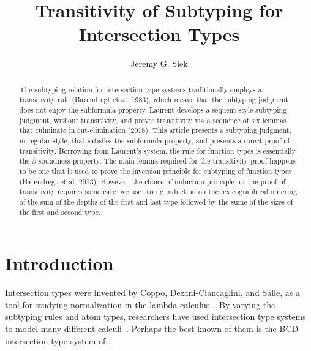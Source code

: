 \documentclass{article}
\title{Transitivity of Subtyping for Intersection Types}
\author{Jeremy G. Siek}
\begin{document}
\maketitle

\newcommand{\TOP}{\ensuremath{\mathtt{U}}}
\newcommand{\dom}[1]{\mathrm{dom}(#1)}
\newcommand{\cod}[1]{\mathrm{cod}(#1)}


\begin{abstract}
  The subtyping relation for intersection type systems traditionally
  employs a transitivity rule (Barendregt et al. 1983), which means
  that the subtyping judgment does not enjoy the subformula property.
  Laurent develops a sequent-style subtyping judgment, without
  transitivity, and proves transitivity via a sequence of six lemmas
  that culminate in cut-elimination (2018). This article presents a
  subtyping judgment, in regular style, that satisfies the subformula
  property, and presents a direct proof of transitivity. Borrowing
  from Laurent's system, the rule for function types is essentially
  the $\beta$-soundness property.  The main lemma required for the
  transitivity proof happens to be one that is used to prove the
  inversion principle for subtyping of function types (Barendregt et
  al. 2013). However, the choice of induction principle for the proof
  of transitivity requires some care: we use strong induction on the
  lexicographical ordering of the sum of the depths of the first and
  last type followed by the sume of the sizes of the first and second
  type.
\end{abstract}

\section{Introduction}

Intersection types were invented by Coppo, Dezani-Ciancaglini, and
Salle, as a tool for studying normalization in the lambda
calculus~\citet{Coppo:1979aa}. By varying the subtyping rules and atom
types, researchers have used intersection type systems to model many
different
calculi~\citep{Coppo:1980ab,Coppo:1981aa,Engeler:1981aa,Coppo:1984aa,Honsell:1992aa,Abramsky:1993fk,Plotkin:1993ab,Honsell:1999aa,Rocca:2004aa,Dezani-Ciancaglini:2005aa,Alessi:2006aa}.
Perhaps the best-known of them is the BCD intersection type system of
\citet{Barendregt:1983aa}.


\citet{Barendregt:2013aa}

\citet{Laurent:2012aa}
\citet{Laurent:2018aa}
\end{document}
